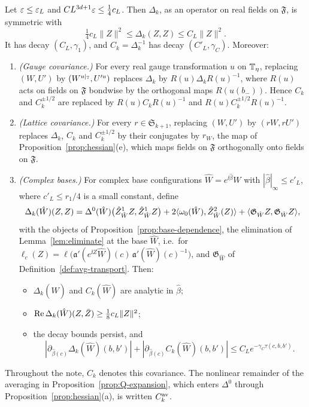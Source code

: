 \begin{corollary}\label{cor:covariance}
Let $\varepsilon\le\varepsilon_L$ and $CL^{3d+1}\varepsilon\le\frac14c_L$. Then $\Delta_k$, as an operator on real fields on $\mathfrak F$, is symmetric with
\[
\tfrac14c_L\|Z\|^2\le\Delta_k(Z,Z)\le C_L\|Z\|^2 .
\]
It has decay $(C_L,\gamma_1)$, and $C_k=\Delta_k^{-1}$ has decay $(C'_L,\gamma_C)$. Moreover:
\begin{enumerate}[label=(\alph*)]
\item \emph{(Gauge covariance.)} For every real gauge transformation $u$ on $\mathbb T_\eta$, replacing $(W,U')$ by $(W^{u|_\mathbb T},U'^u)$ replaces $\Delta_k$ by $R(u)\Delta_kR(u)^{-1}$, where $R(u)$ acts on fields on $\mathfrak F$ bondwise by the orthogonal maps $R(u(b_-))$. Hence $C_k$ and $C_k^{\pm1/2}$ are replaced by $R(u)C_kR(u)^{-1}$ and $R(u)C_k^{\pm1/2}R(u)^{-1}$.
\item \emph{(Lattice covariance.)} For every $r\in\mathfrak S_{k+1}$, replacing $(W,U')$ by $(rW,rU')$ replaces $\Delta_k$, $C_k$ and $C_k^{\pm1/2}$ by their conjugates by $r_W$, the map of Proposition~\ref{prop:hessian}(e), which maps fields on $\mathfrak F$ orthogonally onto fields on $\mathfrak F$.
\item \emph{(Complex bases.)} For complex base configurations $\hat W=e^{\ii\hat\beta}W$ with $|\hat\beta|_\infty\le c'_L$, where $c'_L\le r_1/4$ is a small constant, define
\[
\Delta_k(\hat W)(Z,Z)=\Delta^0(\hat W)\big(\hat Z^1_{\hat W}Z,\hat Z^1_{\hat W}Z\big)+2\langle \omega_0(\hat W),\hat Z^2_{\hat W}(Z)\rangle+\langle \mathfrak G_{\hat W}Z,\mathfrak G_{\hat W}Z\rangle,
\]
with the objects of Proposition~\ref{prop:base-dependence}, the elimination of Lemma~\ref{lem:eliminate} at the base $\hat W$, i.e.\ for $\ell_c(Z)=\ell\big(\mathfrak a'(e^{\ii Z}\hat W)(c)\,\mathfrak a'(\hat W)(c)^{-1}\big)$, and $\mathfrak G_{\hat W}$ of Definition~\ref{def:avg-transport}. Then:
\begin{itemize}
\item $\Delta_k(\hat W)$ and $C_k(\hat W)$ are analytic in $\hat\beta$;
\item $\operatorname{Re}\Delta_k(\hat W)(Z,\bar Z)\ge\frac18c_L\|Z\|^2$;
\item the decay bounds persist, and
\[
|\partial_{\hat\beta(c)}\Delta_k(\hat W)(b,b')|+|\partial_{\hat\beta(c)}C_k(\hat W)(b,b')|\le C_Le^{-\gamma_C\tau(c,b,b')} .
\]
\end{itemize}
\end{enumerate}
\end{corollary}

Throughout the note, $C_k$ denotes this covariance. The nonlinear remainder of the averaging in Proposition~\ref{prop:Q-expansion}, which enters $\Delta^0$ through Proposition~\ref{prop:hessian}(a), is written $C^{\rm av}_k$.

